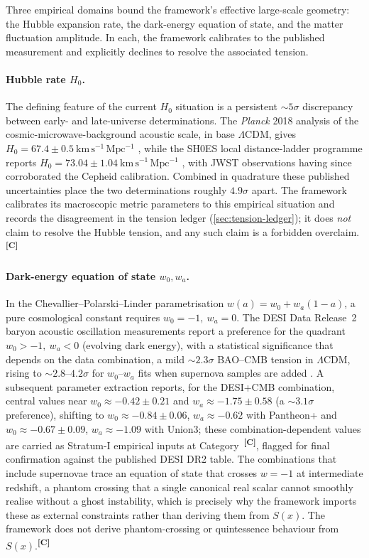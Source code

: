 \documentclass[12pt,a4paper,twoside]{article}
\theoremstyle{plain}
\theoremstyle{definition}
\theoremstyle{remark}
\newcommand{\catmark}[1]{\textsuperscript{\textsf{\textbf{[#1]}}}}
\newcommand{\Sx}{S(x)}
\begin{document}
Three empirical domains bound the framework's effective large-scale geometry: the Hubble expansion rate, the dark-energy equation of state, and the matter fluctuation amplitude. In each, the framework calibrates to the published measurement and explicitly declines to resolve the associated tension.

\paragraph{Hubble rate $H_0$.}
The defining feature of the current $H_0$ situation is a persistent $\sim 5\sigma$ discrepancy between early- and late-universe determinations. The \textit{Planck} 2018 analysis of the cosmic-microwave-background acoustic scale, in base $\Lambda$CDM, gives $H_0 = 67.4 \pm 0.5\ \mathrm{km\,s^{-1}\,Mpc^{-1}}$ \cite{planck2018}, while the SH0ES local distance-ladder programme reports $H_0 = 73.04 \pm 1.04\ \mathrm{km\,s^{-1}\,Mpc^{-1}}$ \cite{riess2022}, with JWST observations having since corroborated the Cepheid calibration. Combined in quadrature these published uncertainties place the two determinations roughly $4.9\sigma$ apart. The framework calibrates its macroscopic metric parameters to this empirical situation and records the disagreement in the tension ledger (\cref{sec:tension-ledger}); it does \emph{not} claim to resolve the Hubble tension, and any such claim is a forbidden overclaim.\catmark{C}

\paragraph{Dark-energy equation of state $w_0, w_a$.}
In the Chevallier--Polarski--Linder parametrisation $w(a)=w_0+w_a(1-a)$, a pure cosmological constant requires $w_0=-1,\ w_a=0$. The DESI Data Release~2 baryon acoustic oscillation measurements report a preference for the quadrant $w_0>-1,\ w_a<0$ (evolving dark energy), with a statistical significance that depends on the data combination, a mild $\sim 2.3\sigma$ BAO--CMB tension in $\Lambda$CDM, rising to $\sim 2.8$--$4.2\sigma$ for $w_0$--$w_a$ fits when supernova samples are added \cite{desidr2}. A subsequent parameter extraction reports, for the DESI+CMB combination, central values near $w_0 \approx -0.42 \pm 0.21$ and $w_a \approx -1.75 \pm 0.58$ (a $\sim 3.1\sigma$ preference), shifting to $w_0 \approx -0.84 \pm 0.06$, $w_a \approx -0.62$ with Pantheon+ and $w_0 \approx -0.67 \pm 0.09$, $w_a \approx -1.09$ with Union3; these combination-dependent values are carried as Stratum-I empirical inputs at Category~\catmark{C}, flagged for final confirmation against the published DESI DR2 table. The combinations that include supernovae trace an equation of state that crosses $w=-1$ at intermediate redshift, a phantom crossing that a single canonical real scalar cannot smoothly realise without a ghost instability, which is precisely why the framework imports these as external constraints rather than deriving them from $\Sx$. The framework does not derive phantom-crossing or quintessence behaviour from $\Sx$.\catmark{C}
\end{document}

